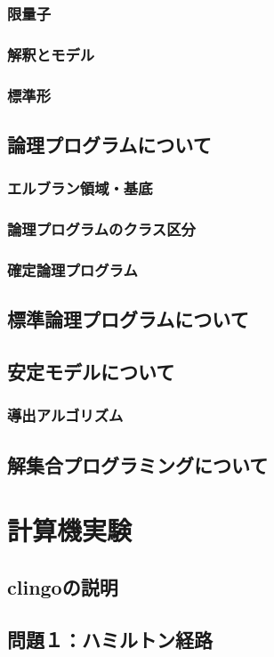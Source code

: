 \documentclass[dvipdfmx]{jsarticle}
\begin{document}
  \subsubsection{限量子}
  \subsubsection{解釈とモデル}
  \subsubsection{標準形}
\subsection{論理プログラムについて}
  \subsubsection{エルブラン領域・基底}
  \subsubsection{論理プログラムのクラス区分}
  \subsubsection{確定論理プログラム}
\subsection{標準論理プログラムについて}
\subsection{安定モデルについて}
  \subsubsection{導出アルゴリズム}
\subsection{解集合プログラミングについて}

\section{計算機実験}
\subsection{clingoの説明}
\subsection{問題１：ハミルトン経路}
\end{document}
